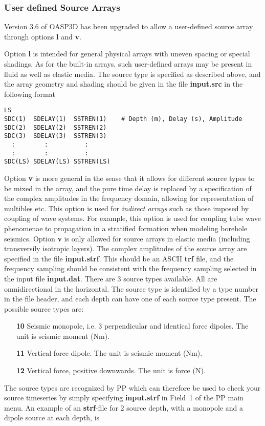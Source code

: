 \subsubsection{User defined Source Arrays}
\label{oasp3sou}

Version 3.6 of OASP3D has been upgraded to allow a user-defined source
array through options {\bf l} and {\bf v}. 

Option {\bf l} is intended
for general physical arrays with uneven spacing or special shadings,
As for the built-in arrays, such user-defined arrays may be present in
fluid as well as elastic media. The source type is specified as
described above, and the array geometry and shading should be given
in the file {\bf input.src} in the following format

\small
\begin{verbatim}
LS
SDC(1)  SDELAY(1)  SSTREN(1)    # Depth (m), Delay (s), Amplitude
SDC(2)  SDELAY(2)  SSTREN(2) 
SDC(3)  SDELAY(3)  SSTREN(3) 
  :        :          :
  :        :          :
SDC(LS) SDELAY(LS) SSTREN(LS) 
\end{verbatim}
\normalsize

Option {\bf v} is more general in the
sense that it allows for different source types to be mixed in the
array, and the pure time delay is replaced by a specification of the
complex amplitudes in the frequency domain, allowing for
representation of multibles etc. This option is used for {\em indirect
arrays} such as those imposed by coupling of wave systems. For
example, 
this option
is used for coupling tube wave phenomenae to propagation in a
stratified formation when modeling borehole seismics. Option {\bf v}
is only allowed for source arrays in elastic media (including
transversily isotropic layers). The complex amplitudes of the source
array are specified in the file {\bf input.strf}. This should be an
ASCII {\bf trf} file, and the frequency sampling should be consistent
with the frequency sampling selected in the input file {\bf input.dat}.
There are 3 source types available. All are omnidirectional in the
horizontal.
The source type is identified by a type number in the file header, 
and each depth can
have one of each source type present. The possible source types are:
\begin{itemize}
\item[{\bf 10}] Seismic monopole, i.e. 3 perpendicular and identical
force dipoles. The unit is seismic moment (Nm).
\item[{\bf 11}] Vertical force dipole. The unit is seismic moment
(Nm).
\item[{\bf 12}] Vertical force, positive downwards. The unit is force
(N).
\end{itemize}
The source types are recognized by PP which can therefore be used to
check your source timeseries by simply specifying {\bf input.strf} in
Field~1 of the PP main menu. 
An example of an {\bf strf}-file for 2 source depth, with a monopole
and a dipole source  at each depth, is

